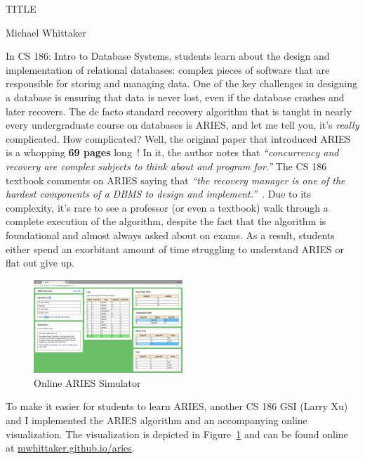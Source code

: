 \documentclass[12pt]{article}
\begin{document}
\begin{center}
  {\Large TITLE}

  Michael Whittaker
\end{center}

In CS 186: Intro to Database Systems, students learn about the design and
implementation of relational databases: complex pieces of software that are
responsible for storing and managing data. One of the key challenges in
designing a database is ensuring that data is never lost, even if the database
crashes and later recovers. The de facto standard recovery algorithm that is
taught in nearly every undergraduate course on databases is ARIES, and let me
tell you, it's \emph{really} complicated. How complicated? Well, the original
paper that introduced ARIES is a whopping \textbf{69 pages}
long~\cite{mohan1992aries}! In it, the author notes that \emph{``concurrency
and recovery are complex subjects to think about and program for.''} The CS 186
textbook comments on ARIES saying that \emph{``the recovery manager is one of
the hardest components of a DBMS to design and
implement.''}~\cite{ramakrishnan2000database}. Due to its complexity, it's rare
to see a professor (or even a textbook) walk through a complete execution of
the algorithm, despite the fact that the algorithm is foundational and almost
always asked about on exams. As a result, students either spend an exorbitant
amount of time struggling to understand ARIES or flat out give up.

\begin{figure}
  \centering
  \includegraphics[width=0.5\textwidth]{aries.png}
  \caption{Online ARIES Simulator}\label{LarrysAries}
\end{figure}

To make it easier for students to learn ARIES, another CS 186 GSI (Larry Xu)
and I implemented the ARIES algorithm and an accompanying online visualization.
The visualization is depicted in Figure~\ref{LarrysAries} and can be found
online at \url{mwhittaker.github.io/aries}.


{
  \footnotesize
  
  
}
\end{document}

